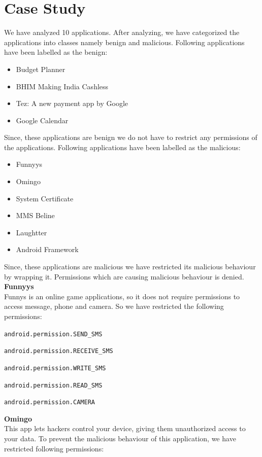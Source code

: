 \section{Case Study}
We have analyzed 10 applications. After analyzing, we have categorized the applications into classes namely benign and malicious. Following applications have been labelled as the benign:
\begin{spacing}{0.9}
\begin{itemize}
    \item Budget Planner
    \item BHIM Making India Cashless
    \item Tez: A new payment app by Google
    \item Google Calendar
\end{itemize}
\end{spacing}
Since, these applications are benign we do not have to restrict any permissions of the applications. Following applications have been labelled as the malicious:
\begin{spacing}{0.9}
\begin{itemize}
    \item Funnyys
    \item Omingo
    \item System Certificate
    \item MMS Beline
    \item Laughtter
    \item Android Framework
\end{itemize}
\end{spacing}
Since, these applications are malicious we have restricted its malicious behaviour by wrapping it. Permissions which are causing malicious behaviour is denied.\\
{\Large \textbf{Funnyys}}\\
Funnys is an online game applications, so it does not require permissions to access message, phone and camera. So we have restricted the following permissions:

\begin{itemize}
\begin{spacing}{0.9}
\item \texttt{android.permission.SEND\_SMS}
\item \texttt{android.permission.RECEIVE\_SMS}
\item \texttt{android.permission.WRITE\_SMS}
\item \texttt{android.permission.READ\_SMS}
\item \texttt{android.permission.CAMERA}
\end{spacing}
\end{itemize}
{\Large\textbf{Omingo}}\\
This app lets hackers control your device, giving them unauthorized access to your data. To prevent the malicious behaviour of this application, we have restricted following permissions:


